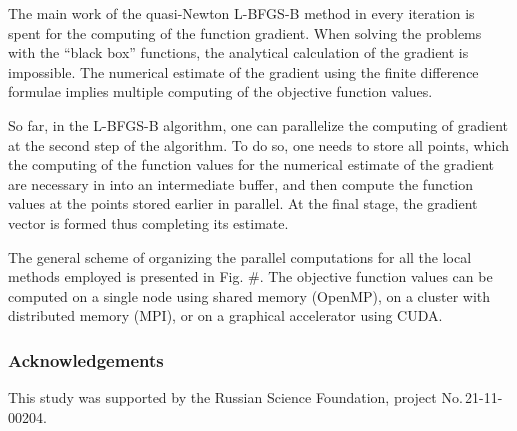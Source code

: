 \documentclass[runningheads]{llncs}
\begin{document}
The main work of the quasi-Newton L-BFGS-B method in every iteration is spent for the computing of the function gradient. When solving the problems with the ``black box'' functions, the analytical calculation of the gradient is impossible. The numerical estimate of the gradient using the finite difference formulae implies multiple computing of the objective function values.

So far, in the L-BFGS-B algorithm, one can parallelize the computing of gradient at the second step of the algorithm. To do so, one needs to store all points, which the computing of the function values for the numerical estimate of the gradient are necessary in into an intermediate buffer, and then compute the function values at the points stored earlier in parallel. At the final stage, the gradient vector is formed thus completing its estimate.

The general scheme of organizing the parallel computations for all the local methods employed is presented in Fig. \#. The objective function values can be computed on a single node using shared memory (OpenMP), on a cluster with distributed memory (MPI), or on a graphical accelerator using CUDA.


\subsubsection{Acknowledgements} This study was supported by the Russian Science Foundation, project No.\,21-11-00204.

%
%
%


%
\end{document}

